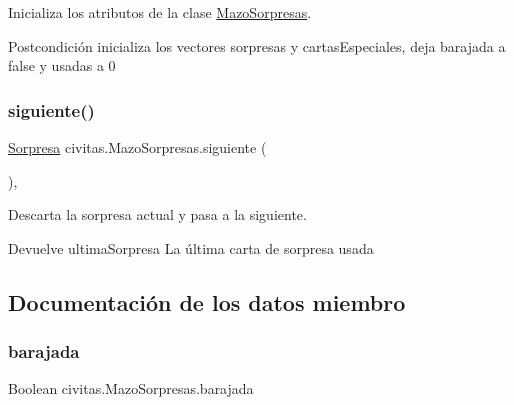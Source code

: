 Inicializa los atributos de la clase \hyperlink{classcivitas_1_1MazoSorpresas}{Mazo\+Sorpresas}. 

\begin{DoxyPostcond}{Postcondición}
inicializa los vectores sorpresas y cartas\+Especiales, deja barajada a false y usadas a 0 
\end{DoxyPostcond}
\mbox{\label{classcivitas_1_1MazoSorpresas_a667df8429be1bc4efa89b2d80ec92fa6}} 
\subsubsection{\texorpdfstring{siguiente()}{siguiente()}}
{\footnotesize\ttfamily \hyperlink{classcivitas_1_1Sorpresa}{Sorpresa} civitas.\+Mazo\+Sorpresas.\+siguiente (\begin{DoxyParamCaption}{ }\end{DoxyParamCaption})\hspace{0.3cm}{\ttfamily [inline]}, {\ttfamily [package]}}



Descarta la sorpresa actual y pasa a la siguiente. 

\begin{DoxyReturn}{Devuelve}
ultima\+Sorpresa La última carta de sorpresa usada 
\end{DoxyReturn}


\subsection{Documentación de los datos miembro}
\mbox{\label{classcivitas_1_1MazoSorpresas_aec96b369692f1dd8bdffbf76c333ad5f}} 
\subsubsection{\texorpdfstring{barajada}{barajada}}
{\footnotesize\ttfamily Boolean civitas.\+Mazo\+Sorpresas.\+barajada\hspace{0.3cm}{\ttfamily [private]}}

\mbox{\label{classcivitas_1_1MazoSorpresas_acd15c95f30ce89bff5b581430f6683ce}} 
